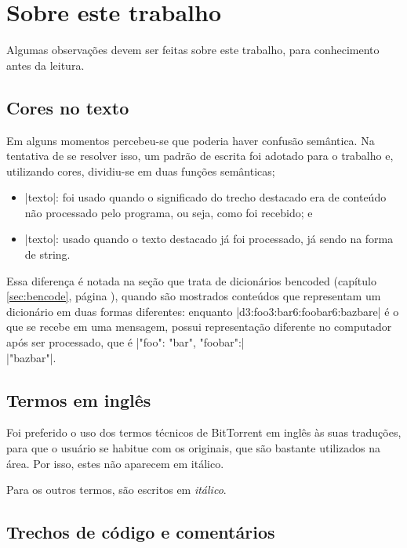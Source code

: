 
\newpage
\chapter*{Sobre este trabalho}

Algumas observações devem ser feitas sobre este trabalho, para conhecimento antes da
leitura.

\section*{Cores no texto}

Em alguns momentos percebeu-se que poderia haver confusão semântica. Na tentativa de se
resolver isso, um padrão de escrita foi adotado para o trabalho e, utilizando cores,
dividiu-se em duas funções semânticas;

\begin{itemize}
    \item \bverb|texto|: foi usado quando o significado do trecho destacado era de
        conteúdo não processado pelo programa, ou seja, como foi recebido; e

    \item \sverb|texto|: usado quando o texto destacado já foi processado, já sendo na
        forma de \gls{string}.
\end{itemize}

Essa diferença é notada na seção que trata de dicionários bencoded (capítulo
\ref{sec:bencode}, página \pageref{sec:bencode}), quando são mostrados conteúdos que
representam um dicionário em duas formas diferentes: enquanto
\bverb|d3:foo3:bar6:foobar6:bazbare| é o que se recebe em uma mensagem, possui
representação diferente no computador após ser processado, que é
\sverb|{"foo": "bar", "foobar":| \\ \sverb|"bazbar"}|.

\section*{Termos em inglês}

Foi preferido o uso dos termos técnicos de BitTorrent em inglês às suas traduções, para
que o usuário se habitue com os originais, que são bastante utilizados na área. Por
isso, estes não aparecem em itálico.

Para os outros termos, são escritos em \emph{itálico}.

\section*{Trechos de código e comentários}

